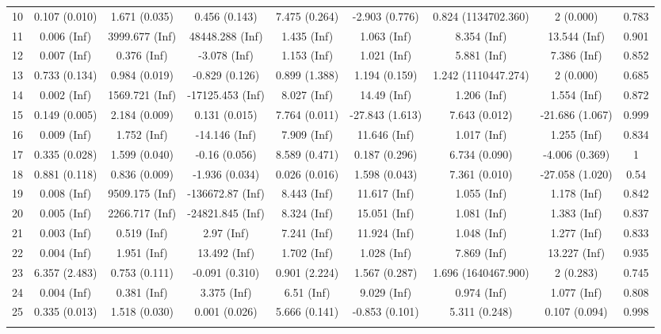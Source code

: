 \begin{tabular}{@{\extracolsep{5pt}} l cccccccc}
10 & 0.107 (0.010) & 1.671 (0.035) & 0.456 (0.143) & 7.475 (0.264) & -2.903 (0.776) & 0.824 (1134702.360) & 2 (0.000) & 0.783 \\ 
11 & 0.006 (Inf) & 3999.677 (Inf) & 48448.288 (Inf) & 1.435 (Inf) & 1.063 (Inf) & 8.354 (Inf) & 13.544 (Inf) & 0.901 \\ 
12 & 0.007 (Inf) & 0.376 (Inf) & -3.078 (Inf) & 1.153 (Inf) & 1.021 (Inf) & 5.881 (Inf) & 7.386 (Inf) & 0.852 \\ 
13 & 0.733 (0.134) & 0.984 (0.019) & -0.829 (0.126) & 0.899 (1.388) & 1.194 (0.159) & 1.242 (1110447.274) & 2 (0.000) & 0.685 \\ 
14 & 0.002 (Inf) & 1569.721 (Inf) & -17125.453 (Inf) & 8.027 (Inf) & 14.49 (Inf) & 1.206 (Inf) & 1.554 (Inf) & 0.872 \\ 
15 & 0.149 (0.005) & 2.184 (0.009) & 0.131 (0.015) & 7.764 (0.011) & -27.843 (1.613) & 7.643 (0.012) & -21.686 (1.067) & 0.999 \\ 
16 & 0.009 (Inf) & 1.752 (Inf) & -14.146 (Inf) & 7.909 (Inf) & 11.646 (Inf) & 1.017 (Inf) & 1.255 (Inf) & 0.834 \\ 
17 & 0.335 (0.028) & 1.599 (0.040) & -0.16 (0.056) & 8.589 (0.471) & 0.187 (0.296) & 6.734 (0.090) & -4.006 (0.369) & 1 \\ 
18 & 0.881 (0.118) & 0.836 (0.009) & -1.936 (0.034) & 0.026 (0.016) & 1.598 (0.043) & 7.361 (0.010) & -27.058 (1.020) & 0.54 \\ 
19 & 0.008 (Inf) & 9509.175 (Inf) & -136672.87 (Inf) & 8.443 (Inf) & 11.617 (Inf) & 1.055 (Inf) & 1.178 (Inf) & 0.842 \\ 
20 & 0.005 (Inf) & 2266.717 (Inf) & -24821.845 (Inf) & 8.324 (Inf) & 15.051 (Inf) & 1.081 (Inf) & 1.383 (Inf) & 0.837 \\ 
21 & 0.003 (Inf) & 0.519 (Inf) & 2.97 (Inf) & 7.241 (Inf) & 11.924 (Inf) & 1.048 (Inf) & 1.277 (Inf) & 0.833 \\ 
22 & 0.004 (Inf) & 1.951 (Inf) & 13.492 (Inf) & 1.702 (Inf) & 1.028 (Inf) & 7.869 (Inf) & 13.227 (Inf) & 0.935 \\ 
23 & 6.357 (2.483) & 0.753 (0.111) & -0.091 (0.310) & 0.901 (2.224) & 1.567 (0.287) & 1.696 (1640467.900) & 2 (0.283) & 0.745 \\ 
24 & 0.004 (Inf) & 0.381 (Inf) & 3.375 (Inf) & 6.51 (Inf) & 9.029 (Inf) & 0.974 (Inf) & 1.077 (Inf) & 0.808 \\ 
25 & 0.335 (0.013) & 1.518 (0.030) & 0.001 (0.026) & 5.666 (0.141) & -0.853 (0.101) & 5.311 (0.248) & 0.107 (0.094) & 0.998 \\ 
 &   &   &   &   &   &   &   &  \\ 

\end{tabular}
